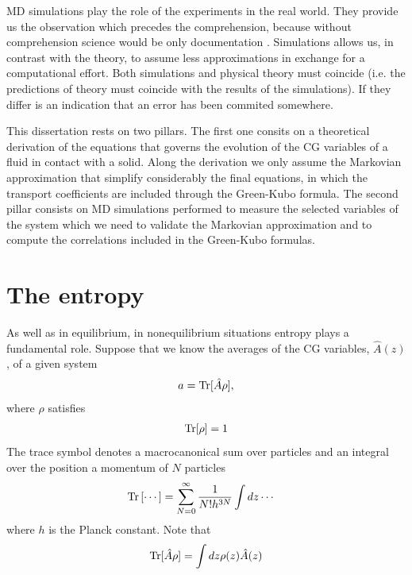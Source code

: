 \documentclass[b5paper,openright,10pt]{book}
\begin{document}
MD simulations play the role of the experiments in the real world. They provide us the observation which precedes the comprehension, because without comprehension science would be only documentation \cite{Rapaport}. Simulations allows us, in contrast with the theory, to assume less approximations in exchange for a computational effort. Both simulations and physical theory must coincide (i.e. the predictions of theory must coincide with the results of the simulations). If they differ is an indication that an error has been commited somewhere.

This dissertation rests on two pillars. The first one consits on a theoretical derivation of the equations that governs the evolution of the CG variables of a fluid in contact with a solid. 
Along the derivation we only assume the Markovian approximation that simplify considerably the final equations, in which the transport coefficients are included through the Green-Kubo formula. 
The second pillar consists on MD simulations performed to measure the selected variables of the system which we need to validate the Markovian approximation and to compute the correlations included in the Green-Kubo formulas.

\section{The entropy}\label{Sec:TheEntropy}
As well as in equilibrium, in nonequilibrium situations entropy plays a fundamental role. 
Suppose that we know the averages of the CG variables, $\hat{A}(z)$, of a given system 
\begin{align}
    a = {\rm Tr}[{\hat{A}}\rho] ,
    \label{ave0}
\end{align}
where $\rho$ satisfies
\begin{align}
    {\rm Tr}[\rho] = 1
    \label{intrho}
\end{align}
The trace symbol denotes a macrocanonical sum over particles and an integral over the position a momentum of $N$ particles
\begin{align}
  {\rm Tr}\left[\cdots\right]&=\sum_{N=0}^\infty \frac{1}{N!h^{3N}}
\int dz\cdots
\end{align}
where $h$ is the Planck constant. 
Note that 
\begin{align}
    {\rm Tr}[\hat{A}\rho] = \int dz\rho(z)\hat{A}(z) 
\end{align}
\end{document}
